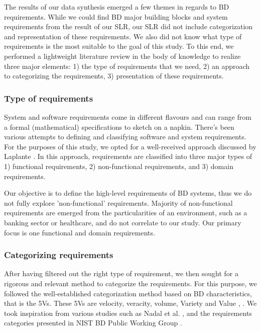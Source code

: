 \documentclass{bmcart}
\begin{document}
The results of our data synthesis emerged a few themes in regards to BD requirements. While we could find BD major building blocks and system requirements from the result of our SLR, our SLR did not include categorization and representation of these requirements. We also did not know what type of requirements is the most suitable to the goal of this study. To this end, we performed a lightweight literature review in the body of knowledge to realize three major elements: 1) the type of requirements that we need, 2) an approach to categorizing the requirements, 3) presentation of these requirements. 

\subsubsection{Type of requirements}
System and software requirements come in different flavours and can range from a formal (mathematical) specifications to sketch on a napkin. There's been various attempts to defining and classifying software and system requirements. For the purposes of this study, we opted for a well-received approach discussed by Laplante \cite{laplante2017requirements}. In this approach, requirements are classified into three major types of 1) functional requirements, 2) non-functional requirements, and 3) domain requirements. 

Our objective is to define the high-level requirements of BD systems, thus we do not fully explore 'non-functional' requirements. Majority of non-functional requirements are emerged from the particularities of an environment, such as a banking sector or healthcare, and do not correlate to our study. Our primary focus is one functional and domain requirements. 

\subsubsection{Categorizing requirements} After having filtered out the right type of requirement, we then sought for a rigorous and relevant method to categorize the requirements. For this purpose, we followed the well-established categorization method based on BD characteristics, that is the 5Vs. These 5Vs are velocity, veracity, volume, Variety and Value \cite{Bughin2016}, \cite{rad2017big}. We took inspiration from various studies such as Nadal et al. \cite{nadal2017software}, and the requirements categories presented in NIST BD Public Working Group \cite{Chang.2019}.

\end{document}
